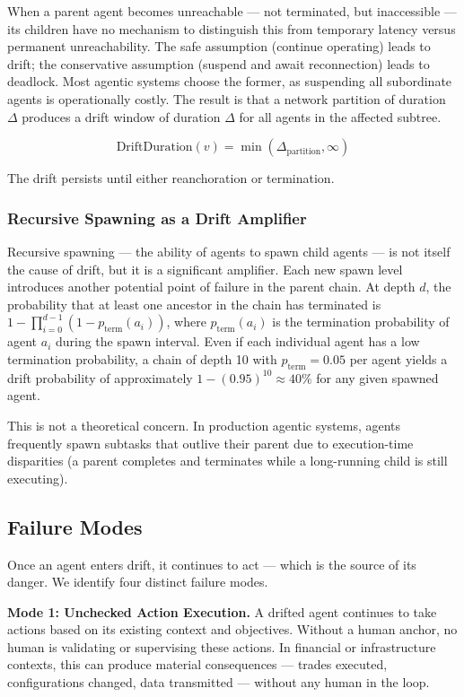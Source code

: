 When a parent agent becomes unreachable — not terminated, but inaccessible — its children have no mechanism to distinguish this from temporary latency versus permanent unreachability. The safe assumption (continue operating) leads to drift; the conservative assumption (suspend and await reconnection) leads to deadlock. Most agentic systems choose the former, as suspending all subordinate agents is operationally costly. The result is that a network partition of duration $\Delta$ produces a drift window of duration $\Delta$ for all agents in the affected subtree.

\[
\text{DriftDuration}(v) = \min(\Delta_{\text{partition}}, \infty)
\]

The drift persists until either reanchoration or termination.

\subsubsection{Recursive Spawning as a Drift Amplifier}

Recursive spawning — the ability of agents to spawn child agents — is not itself the cause of drift, but it is a significant amplifier. Each new spawn level introduces another potential point of failure in the parent chain. At depth $d$, the probability that at least one ancestor in the chain has terminated is $1 - \prod_{i=0}^{d-1} (1 - p_{\text{term}}(a_i))$, where $p_{\text{term}}(a_i)$ is the termination probability of agent $a_i$ during the spawn interval. Even if each individual agent has a low termination probability, a chain of depth 10 with $p_{\text{term}} = 0.05$ per agent yields a drift probability of approximately $1 - (0.95)^{10} \approx 40\%$ for any given spawned agent.

This is not a theoretical concern. In production agentic systems, agents frequently spawn subtasks that outlive their parent due to execution-time disparities (a parent completes and terminates while a long-running child is still executing).

\subsection{Failure Modes}

Once an agent enters drift, it continues to act — which is the source of its danger. We identify four distinct failure modes.

\textbf{Mode 1: Unchecked Action Execution.} A drifted agent continues to take actions based on its existing context and objectives. Without a human anchor, no human is validating or supervising these actions. In financial or infrastructure contexts, this can produce material consequences — trades executed, configurations changed, data transmitted — without any human in the loop.


